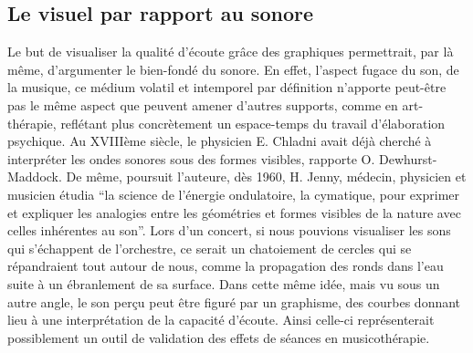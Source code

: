 \subsection{Le visuel par rapport au sonore}  
Le but de visualiser la  qualité d'écoute   %
grâce  des 
graphiques permettrait, par là même, d'argumenter le bien-fondé du sonore. %
En effet, l'aspect fugace du son, de la musique, ce médium volatil et
intemporel par
définition n'apporte peut-être pas le
même aspect que peuvent amener d'autres supports, comme en art-thérapie, 
reflétant plus concrètement un espace-temps du travail d'élaboration
psychique.
 Au XVIIIème siècle, le 
physicien E. Chladni avait déjà cherché à interpréter les ondes sonores sous des formes visibles,
rapporte O. Dewhurst-Maddock. De même, poursuit l'auteure, dès 1960, H. Jenny, 
médecin, physicien et musicien étudia  ``la science de l'énergie ondulatoire, la cymatique, pour exprimer 
et expliquer les analogies entre les géométries et formes visibles de la nature avec celles inhérentes au 
son''\autocite [30] {Dewhurst}. %
Lors d'un concert, si nous pouvions visualiser les sons qui
s'échappent de l'orchestre, ce serait un chatoiement de cercles qui se
répandraient tout autour de nous, comme
la propagation des
ronds dans l'eau suite à un ébranlement de sa surface.
Dans cette même idée, mais vu sous un autre angle, le  son perçu peut 
être figuré par un graphisme, des courbes donnant lieu à une 
interprétation de la capacité d'écoute.
Ainsi celle-ci représenterait possiblement  un 
outil de validation des effets de séances en musicothérapie. 
